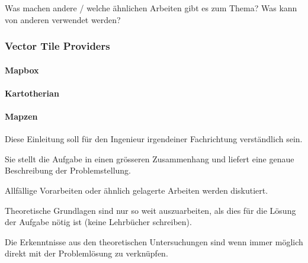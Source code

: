 Was machen andere / welche ähnlichen Arbeiten gibt es zum Thema? Was
kann von anderen verwendet werden?

\subsubsection{Vector Tile Providers}\label{vector-tile-providers}

\paragraph{Mapbox}

\paragraph{Kartotherian}

\paragraph{Mapzen}

Diese Einleitung soll für den Ingenieur irgendeiner Fachrichtung
verständlich sein.

Sie stellt die Aufgabe in einen grösseren Zusammenhang und liefert eine
genaue Beschreibung der Problemstellung.

Allfällige Vorarbeiten oder ähnlich gelagerte Arbeiten werden
diskutiert.

Theoretische Grundlagen sind nur so weit auszuarbeiten, als dies für die
Lösung der Aufgabe nötig ist (keine Lehrbücher schreiben).

Die Erkenntnisse aus den theoretischen Untersuchungen sind wenn immer
möglich direkt mit der Problemlösung zu verknüpfen.